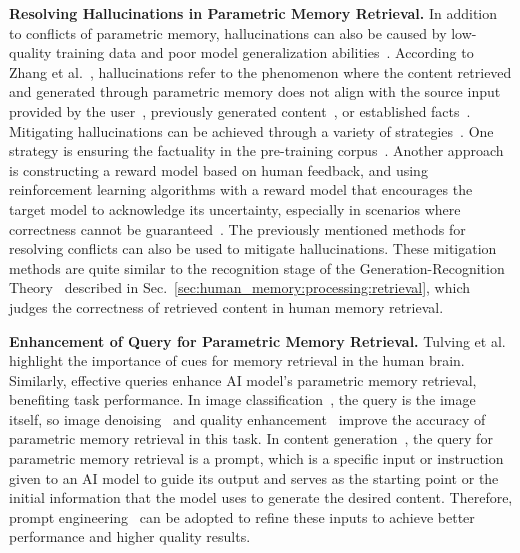 \documentclass[journal,hideappendix]{vgtc}
\newenvironment{j_itemize}{
\begin{itemize}[]
  \setlength{\itemsep}{3pt}
  \setlength{\parskip}{0pt}
  \setlength{\parsep}{0pt}
}{\end{itemize}}
\begin{document}
\begin{j_itemize}
    \item[$\bullet$] \textbf{Resolving Hallucinations in Parametric Memory Retrieval.} In addition to conflicts of parametric memory, hallucinations can also be caused by low-quality training data and poor model generalization abilities~\cite{zhang2023siren}. According to Zhang et al.~\cite{zhang2023siren}, hallucinations refer to the phenomenon where the content retrieved and generated through parametric memory does not align with the source input provided by the user~\cite{adlakhaetal2024evaluating}, previously generated content~\cite{liuetal2022token}, or established facts~\cite{minetal2023factscore}. Mitigating hallucinations can be achieved through a variety of strategies~\cite{zhang2023siren}. One strategy is ensuring the factuality in the pre-training corpus~\cite{gardent2017creating,parikhetal2020totto,lee2022factuality}. Another approach is constructing a reward model based on human feedback, and using reinforcement learning algorithms with a reward model that encourages the target model to acknowledge its uncertainty, especially in scenarios where correctness cannot be guaranteed~\cite{schulman2017proximal,fernandes2023bridging}. 
    The previously mentioned methods for resolving conflicts can also be used to mitigate hallucinations. 
    These mitigation methods are quite similar to the recognition stage of the Generation-Recognition Theory~\cite{shiffrin1969memory,underwood1969memory,tulving1973encoding} described in Sec.~\ref{sec:human_memory:processing:retrieval}, which judges the correctness of retrieved content in human memory retrieval.

    \item[$\bullet$] \textbf{Enhancement of Query for Parametric Memory Retrieval.} Tulving et al.~\cite{tulving1973encoding,bower1972encoding} highlight the importance of cues for memory retrieval in the human brain. Similarly, effective queries enhance AI model's parametric memory retrieval, benefiting task performance. In image classification~\cite{lu2007survey}, the query is the image itself, so image denoising~\cite{tian2020deep} and quality enhancement~\cite{sharma2018classification} improve the accuracy of parametric memory retrieval in this task. 
    In content generation~\cite{kenton2019bert,yu2023generate,wen2024hard}, the query for parametric memory retrieval is a prompt, which is a specific input or instruction given to an AI model to guide its output and serves as the starting point or the initial information that the model uses to generate the desired content.
    Therefore, prompt engineering~\cite{pryzant2023automatic,wen2024hard} can be adopted to refine these inputs to achieve better performance and higher quality results.

\end{j_itemize}
\end{document}
